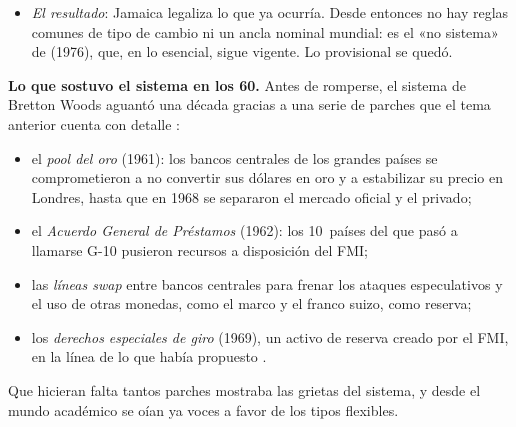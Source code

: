\documentclass[11pt]{article}
\begin{document}
\begin{itemize}
\begin{enumerate}
\begin{itemize}
    \item \emph{un código de buena conducta}: el FMI vigila que no haya manipulación del tipo de cambio para ganar competitividad ni devaluaciones competitivas (artículo IV) y da asistencia técnica en política cambiaria ;
    \item \emph{desmonetización del oro}: se suprime su precio oficial y el FMI vende parte de su oro;
    \item \emph{el DEG}: se aspira a que sea el principal activo de reserva, algo que nunca llegó a ocurrir.
    \end{itemize}
  \end{enumerate}
\item \emph{El resultado}: Jamaica legaliza lo que ya ocurría. Desde entonces no hay reglas comunes de tipo de cambio ni un ancla nominal mundial: es el «no sistema» de  (1976), que, en lo esencial, sigue vigente. Lo provisional se quedó.
\end{itemize}

\begin{anotaciones}
\textbf{Lo que sostuvo el sistema en los 60.} Antes de romperse, el sistema de Bretton Woods aguantó una década gracias a una serie de parches que el tema anterior cuenta con detalle :
\begin{itemize}
\item el \emph{pool del oro} (1961): los bancos centrales de los grandes países se comprometieron a no convertir sus dólares en oro y a estabilizar su precio en Londres, hasta que en 1968 se separaron el mercado oficial y el privado;
\item el \emph{Acuerdo General de Préstamos} (1962): los 10~países del que pasó a llamarse G-10 pusieron recursos a disposición del FMI;
\item las \emph{líneas swap} entre bancos centrales para frenar los ataques especulativos y el uso de otras monedas, como el marco y el franco suizo, como reserva;
\item los \emph{derechos especiales de giro} (1969), un activo de reserva creado por el FMI, en la línea de lo que había propuesto .
\end{itemize}
Que hicieran falta tantos parches mostraba las grietas del sistema, y desde el mundo académico se oían ya voces a favor de los tipos flexibles.
\end{anotaciones}
\end{document}
